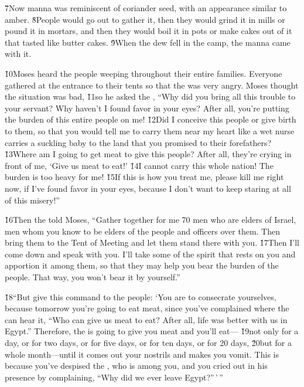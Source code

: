\v{7}Now manna was reminiscent of coriander seed, with an appearance similar to amber. \v{8}People would go out to gather it, then they would grind it in mills or pound it in mortars, and then they would boil it in pots or make cakes out of it that tasted like butter cakes. \v{9}When the dew fell in the camp, the manna came with it.

\v{10}Moses heard the people weeping throughout their entire families. Everyone gathered at the entrance to their tents so that the  was very angry. Moses thought the situation was bad, \v{11}so he asked the , ``Why did you bring all this trouble to your servant? Why haven't I found favor in your eyes? After all, you're putting the burden of this entire people on me! \v{12}Did I conceive this people or give birth to them, so that you would tell me to carry them near my heart like a wet nurse carries a suckling baby to the land that you promised to their forefathers? \v{13}Where am I going to get meat to give this people? After all, they're crying in front of me, `Give us meat to eat!' \v{14}I cannot carry this whole nation! The burden is too heavy for me! \v{15}If this is how you treat me, please kill me right now, if I've found favor in your eyes, because I don't want to keep staring at all of this misery!''

\v{16}Then the  told Moses, ``Gather together for me 70 men who are elders of Israel, men whom you know to be elders of the people and officers over them. Then bring them to the Tent of Meeting and let them stand there with you. \v{17}Then I'll come down and speak with you. I'll take some of the spirit that rests on you and apportion it among them, so that they may help you bear the burden of the people. That way, you won't bear it by yourself.''

\v{18}``But give this command to the people: `You are to consecrate yourselves, because tomorrow you're going to eat meat, since you've complained where the  can hear it, ``Who can give us meat to eat? After all, life was better with us in Egypt.'' Therefore, the  is going to give you meat and you'll eat--- \v{19}not only for a day, or for two days, or for five days, or for ten days, or for 20 days, \v{20}but for a whole month---until it comes out your nostrils and makes you vomit. This is because you've despised the , who is among you, and you cried out in his presence by complaining, ``Why did we ever leave Egypt?''\,'\,''

